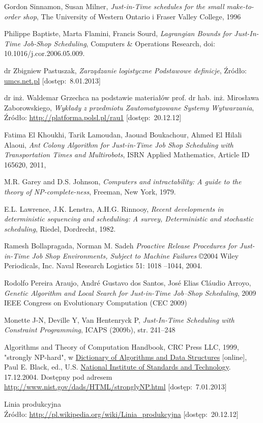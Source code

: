 \documentclass[twoside]{kInzynierka}
\begin{document}
\begin{thebibliography}{10}

Gordon Sinnamon, Susan Milner,
\emph{Just-in-Time schedules for the small make-to-order shop},
The University of Western Ontario i Fraser Valley College, 1996

Philippe Baptiste, Marta Flamini, Francis Sourd,
\emph{Lagrangian Bounds for Just-In-Time Job-Shop Scheduling},
Computers \& Operations Research, doi: 10.1016/j.cor.2006.05.009.

dr Zbigniew Pastuszak,
\emph{Zarządzanie logistyczne Podstawowe definicje},
Źródło: \url{umcs.net.pl} [dostęp:~8.01.2013]

dr inż. Waldemar Grzechca na podstawie materiałów prof. dr hab. inż. Mirosława Zaborowskiego,
\emph{Wykłady z przedmiotu Zautomatyzowane Systemy Wytwarzania},
Źródło: \url{http://platforma.polsl.pl/rau1} [dostęp:~20.12.12]

Fatima El Khoukhi, Tarik Lamoudan, Jaouad Boukachour, Ahmed El Hilali Alaoui,  
\emph{Ant Colony Algorithm for Just-in-Time Job Shop Scheduling with Transportation Times and Multirobots},
ISRN Applied Mathematics, Article ID 165620, 2011, 

M.R. Garey and D.S. Johnson, 
\emph{Computers and intractability: A guide to the theory of NP-complete-ness},
Freeman, New York, 1979.

E.L. Lawrence, J.K. Lenstra, A.H.G. Rinnooy, 
\emph{Recent developments in deterministic sequencing and scheduling: A survey, Deterministic and stochastic scheduling},
Riedel, Dordrecht, 1982.

Ramesh Bollapragada, Norman M. Sadeh
\emph{Proactive Release Procedures for Just-in-Time Job Shop Environments, Subject to Machine Failures}
\copyright 2004 Wiley Periodicals, Inc. Naval Research Logistics 51: 1018 –1044, 2004.

Rodolfo Pereira Araujo, André Gustavo dos Santos, José Elias Cláudio Arroyo,
\emph{Genetic Algorithm and Local Search for Just-in-Time Job–Shop Scheduling},
2009 IEEE Congress on Evolutionary Computation (CEC 2009)

\newpage

Monette J-N, Deville Y, Van Hentenryck P,
\emph{Just-In-Time Scheduling with Constraint Programming},
ICAPS (2009b), str. 241–248

Algorithms and Theory of Computation Handbook, CRC Press LLC, 1999, "strongly NP-hard", w \href{http://xlinux.nist.gov/dads/}{Dictionary of Algorithms and Data Structures} [online], Paul E. Black, ed., U.S. \href{http://www.nist.gov/}{National Institute of Standards and Technology}. 17.12.2004. Dostępny pod adresem \url{http://www.nist.gov/dads/HTML/stronglyNP.html} [dostęp:~7.01.2013]


Linia produkcyjna \\
Źródło: \url{http://pl.wikipedia.org/wiki/Linia_produkcyjna} [dostęp:~20.12.12]

\end{thebibliography}
\end{document}
